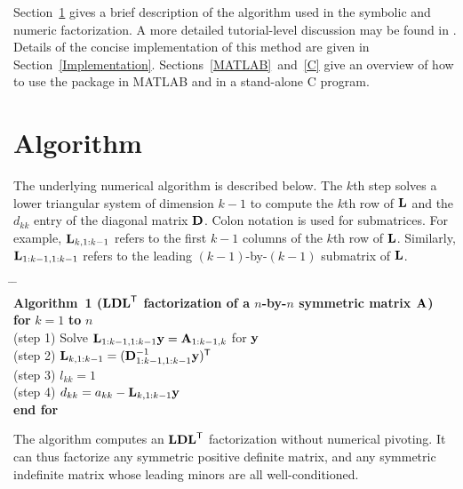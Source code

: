\documentclass[12pt]{article}
\newcommand{\m}[1]{{\bf{#1}}}       %
\newcommand{\tr}{^{\sf T}}          %
\begin{document}
Section~\ref{Algorithm} gives a brief description of the algorithm
used in the symbolic and numeric factorization.  A more detailed tutorial-level
discussion may be found in \cite{Stewart03}.  Details
of the concise implementation of this method are given in
Section~\ref{Implementation}.  Sections~\ref{MATLAB}~and~\ref{C} give an
overview of how to use the package in MATLAB and in a stand-alone C program.

\section{Algorithm}
\label{Algorithm}

The underlying numerical algorithm is described below.  The $k$th
step solves a lower triangular system of dimension $k-1$ to compute the
$k$th row of $\m{L}$ and the $d_{kk}$ entry of the diagonal matrix $\m{D}$.
Colon notation is used for submatrices.  For example,
$\m{L}_{k,1:k-1}$ refers to the first $k-1$ columns of
the $k$th row of $\m{L}$.  Similarly, $\m{L}_{1:k-1,1:k-1}$ refers to
the leading $(k-1)$-by-$(k-1)$ submatrix of $\m{L}$.
\vspace{-0.2in}
\begin{tabbing}
\hspace{2em} \= \hspace{2em} \= \hspace{2em} \= \\
{\bf Algorithm~1
($\m{LDL}\tr$ factorization of a $n$-by-$n$ symmetric matrix $\m{A}$)} \\
\> {\bf for} $k = 1$ {\bf to} $n$ \\
\>\> (step 1) Solve $\m{L}_{1:k-1,1:k-1}\m{y} = \m{A}_{1:k-1,k}$ for $\m{y}$ \\
\>\> (step 2) $\m{L}_{k,1:k-1} = (\m{D}_{1:k-1,1:k-1}^{-1} \m{y})\tr$ \\
\>\> (step 3) $l_{kk} = 1$ \\
\>\> (step 4) $d_{kk} = a_{kk} - \m{L}_{k,1:k-1}\m{y}$ \\
\> {\bf end for}
\end{tabbing}

The algorithm computes an $\m{LDL}\tr$ factorization without numerical pivoting.
It can thus factorize any symmetric positive definite matrix, and any
symmetric indefinite matrix whose leading minors are all well-conditioned.
\end{document}
